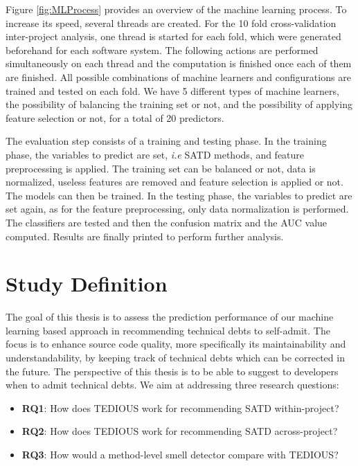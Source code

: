  
 Figure \ref{fig:MLProcess} provides an overview of the machine learning process. To increase its speed, several threads are created. For the 10 fold cross-validation inter-project analysis, one thread is started for each fold, which were generated beforehand for each software system. The following actions are performed simultaneously on each thread and the computation is finished once each of them are finished. All possible combinations of machine learners and configurations are trained and tested on each fold. We have 5 different types of machine learners, the possibility of balancing the training set or not, and the possibility of applying feature selection or not, for a total of 20 predictors. \par
 
 The evaluation step consists of a training and testing phase. In the training phase, the variables to predict are set, \emph{i.e} \ac{SATD} methods, and feature preprocessing is applied. The training set can be balanced or not, data is normalized, useless features are removed and feature selection is applied or not. The models can then be trained. In the testing phase, the variables to predict are set again, as for the feature preprocessing, only data normalization is performed. The classifiers are tested and then the confusion matrix and the AUC value computed. Results are finally printed to perform further analysis.
 
\section{Study Definition}


The goal of this thesis is to assess the prediction performance of our machine learning based approach in recommending technical debts to self-admit. The focus is to enhance source code quality, more specifically its maintainability and understandability, by keeping track of technical debts which can be corrected in the future. The perspective of this thesis is to be able to suggest to developers when to admit technical debts. We aim at addressing three research questions:

\begin{itemize}
	\item \textbf{RQ1}: How does \ac{TEDIOUS} work for recommending \ac{SATD} within-project?
	\item \textbf{RQ2}: How does \ac{TEDIOUS} work for recommending \ac{SATD} across-project?
	\item \textbf{RQ3}: How would a method-level smell detector compare with \ac{TEDIOUS}?
\end{itemize}


